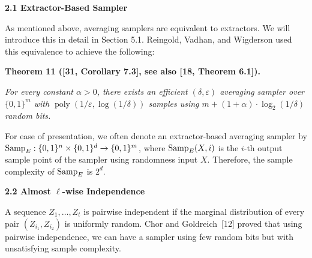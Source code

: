 \documentclass[10pt,a4paper]{article}
\begin{document}



\par\medskip\noindent\textbf{
2.1 Extractor-Based Sampler}\par




As mentioned above, averaging samplers are equivalent to extractors. We will introduce this in detail in Section 5.1.
Reingold, Vadhan, and Wigderson used this equivalence to achieve the following:\par





\par\medskip\noindent\textbf{
\textbf{Theorem 11}\textbf{ }([31, Corollary 7.3], see also [18, Theorem 6.1])\textbf{.}
}\par



\emph{For every constant $\alpha>0$, there exists an efficient $(\delta,\varepsilon)$ averaging sampler over $\{0,1\}^{m}$ with $\operatorname*{poly}(1/\varepsilon,\log(1/\delta))$ samples using $m+(1+\alpha)\cdot\log_{2}(1/\delta)$ random bits.}\par






For ease of presentation, we often denote an extractor-based averaging sampler by $\textup{{Samp}}_{E}:\{0,1\}^{n}\times\{0,1\}^{d}\to\{0,1\}^{m}$, where $\textup{{Samp}}_{E}(X,i)$ is the $i$-th output sample point of the sampler using randomness input $X$. Therefore, the sample complexity of $\textup{{Samp}}_{E}$ is $2^{d}$.\par





\par\medskip\noindent\textbf{
2.2 Almost $\ell$-wise Independence}\par




A sequence $Z_{1},\dots,Z_{t}$ is pairwise independent if the marginal distribution of every pair $(Z_{i_{1}},Z_{i_{2}})$ is uniformly random.
Chor and Goldreich [12] proved that using pairwise independence, we can have a sampler using few random bits but with unsatisfying sample complexity.\par
\end{document}
